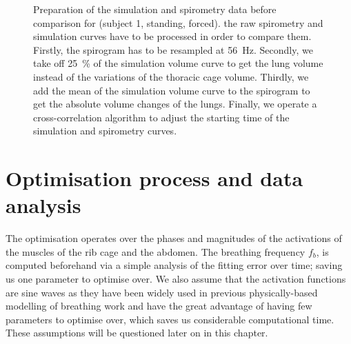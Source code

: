 \begin{figure}
{\label{fig:prep_spir_mean}
}
\caption[Preparation of the simulation and spirometry data before comparison]{\label{fig:preparing_spir_simu}Preparation of the simulation and spirometry data before comparison for (subject 1, standing, forced).
 the raw spirometry and  simulation curves have to be processed in order to compare them.
Firstly,  the spirogram has to be resampled at 56~Hz.
Secondly,  we take off 25~\% of the simulation volume curve to get the lung volume instead of the variations of the thoracic cage volume.
Thirdly,  we add the mean of the simulation volume curve to the spirogram to get the absolute volume changes of the lungs.
Finally,  we operate a cross-correlation algorithm to adjust the starting time of the simulation and spirometry curves.
}
\end{figure}

\section{\label{sec:optim_process}Optimisation process and data analysis}
The optimisation operates over the phases and magnitudes of the activations of the muscles of the rib cage and the abdomen. The breathing frequency $f_b$, is computed beforehand via a simple analysis of the fitting error over time; saving us one parameter to optimise over. We also assume that the activation functions are sine waves as they have been widely used in previous physically-based modelling of breathing work \cite{zordan2004breathe, lee2009comprehensive, veltkamp2009physiological} and have the great advantage of having few parameters to optimise over, which saves us considerable computational time. These assumptions will be questioned later on in this chapter.

